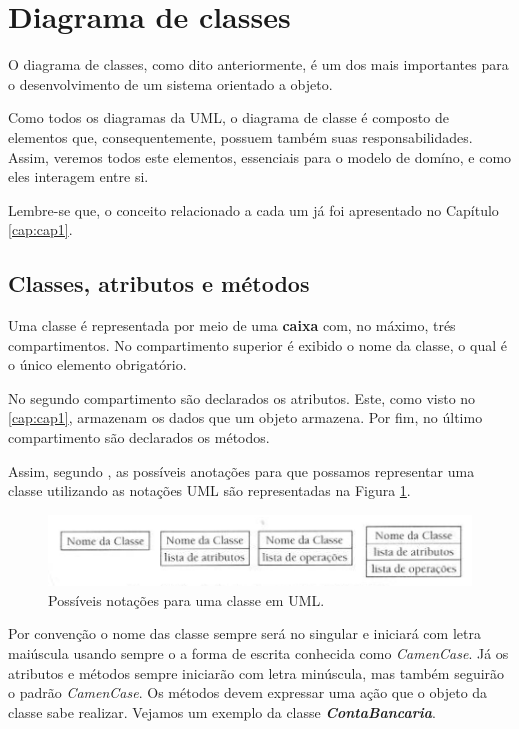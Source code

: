 \section{Diagrama de classes}

O diagrama de classes, como dito anteriormente, é um dos mais importantes para o desenvolvimento de um sistema orientado a objeto. 

Como todos os diagramas da UML, o diagrama de classe é composto de elementos que, consequentemente, possuem também suas responsabilidades. Assim, veremos todos este elementos, essenciais para o modelo de domíno, e como eles interagem entre si.

Lembre-se que, o conceito relacionado a cada um já foi apresentado no Capítulo \ref{cap:cap1}.

\subsection{Classes, atributos e métodos}

Uma classe é representada por meio de uma \textbf{caixa} com, no máximo, trés compartimentos. No compartimento superior é exibido o nome da classe, o qual é o único elemento obrigatório. 

No segundo compartimento são declarados os atributos. Este, como visto no \ref{cap:cap1}, armazenam os dados que um objeto armazena. Por fim, no último compartimento são declarados os métodos. 

Assim, segundo , as possíveis anotações para que possamos representar uma classe utilizando as notações UML são representadas na Figura \ref{fig:notacoes-uml-diagrama-de-classes}.

\begin{figure}[H]
	\centering
	\includegraphics[scale=0.5]{imagens/notacoes-uml-classes.png}
	\caption{Possíveis notações para uma classe em UML.}
	\label{fig:notacoes-uml-diagrama-de-classes}
\end{figure} 

Por convenção o nome das classe sempre será no singular e iniciará com letra maiúscula usando sempre o a forma de escrita conhecida como \textit{CamenCase}. Já os atributos e métodos sempre iniciarão com letra minúscula, mas também seguirão o padrão \textit{CamenCase}. Os métodos devem expressar uma ação que o objeto da classe sabe realizar. Vejamos um exemplo da classe \textbf{\textit{ContaBancaria}}.

